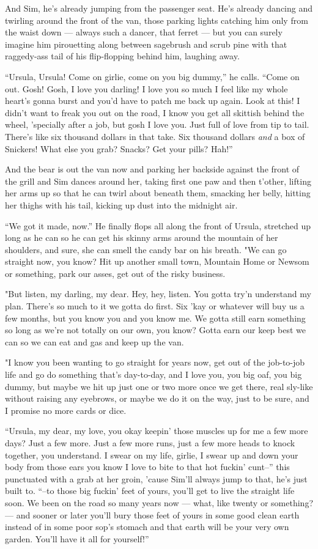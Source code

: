 And Sim, he's already jumping from the passenger seat. He's already dancing and twirling around the front of the van, those parking lights catching him only from the waist down --- always such a dancer, that ferret --- but you can surely imagine him pirouetting along between sagebrush and scrub pine with that raggedy-ass tail of his flip-flopping behind him, laughing away.

``Ursula, Ursula! Come on girlie, come on you big dummy,'' he calls. ``Come on out. Gosh! Gosh, I love you darling! I love you so much I feel like my whole heart's gonna burst and you'd have to patch me back up again. Look at this! I didn't want to freak you out on the road, I know you get all skittish behind the wheel, 'specially after a job, but gosh I love you. Just full of love from tip to tail. There's like six thousand dollars in that take. Six thousand dollars \emph{and} a box of Snickers! What else you grab? Snacks? Get your pills? Hah!''

And the bear is out the van now and parking her backside against the front of the grill and Sim dances around her, taking first one paw and then t'other, lifting her arms up so that he can twirl about beneath them, smacking her belly, hitting her thighs with his tail, kicking up dust into the midnight air.

``We got it made, now.'' He finally flops all along the front of Ursula, stretched up long as he can so he can get his skinny arms around the mountain of her shoulders, and sure, she can smell the candy bar on his breath. "We can go straight now, you know? Hit up another small town, Mountain Home or Newsom or something, park our asses, get out of the risky business.

"But listen, my darling, my dear. Hey, hey, listen. You gotta try'n understand my plan. There's so much to it we gotta do first. Six 'kay or whatever will buy us a few months, but you know you and you know me. We gotta still earn something so long as we're not totally on our own, you know? Gotta earn our keep best we can so we can eat and gas and keep up the van.

"I know you been wanting to go straight for years now, get out of the job-to-job life and go do something that's day-to-day, and I love you, you big oaf, you big dummy, but maybe we hit up just one or two more once we get there, real sly-like without raising any eyebrows, or maybe we do it on the way, just to be sure, and I promise no more cards or dice.

``Ursula, my dear, my love, you okay keepin' those muscles up for me a few more days? Just a few more. Just a few more runs, just a few more heads to knock together, you understand. I swear on my life, girlie, I swear up and down your body from those ears you know I love to bite to that hot fuckin' cunt--'' this punctuated with a grab at her groin, 'cause Sim'll always jump to that, he's just built to. ``--to those big fuckin' feet of yours, you'll get to live the straight life soon. We been on the road so many years now --- what, like twenty or something? --- and sooner or later you'll bury those feet of yours in some good clean earth instead of in some poor sop's stomach and that earth will be your very own garden. You'll have it all for yourself!''

